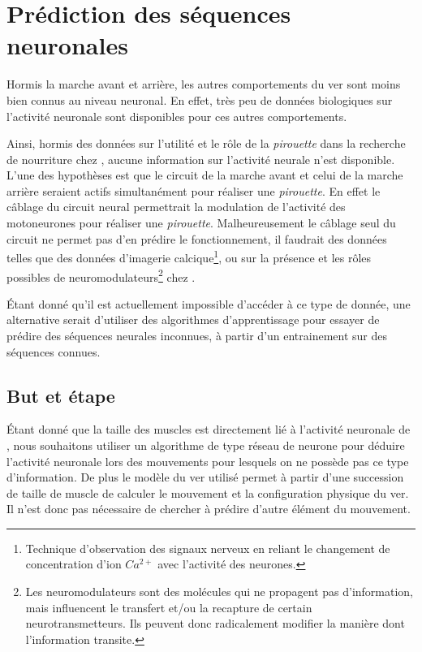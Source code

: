 \chapter{Prédiction des séquences neuronales} %
\label{cha:Prédire des séquences neuronales}

Hormis la marche avant et arrière, les autres comportements du ver sont moins
bien connus au niveau neuronal. En effet, très peu de données biologiques sur l'activité
neuronale sont disponibles pour ces autres comportements.

Ainsi, hormis des données sur l'utilité et le rôle de la \textit{pirouette}
dans la recherche de nourriture chez \celeg{}\cite{Gray2005}, aucune
information sur l'activité neurale n'est disponible. L'une des hypothèses
est que le circuit de la marche avant et celui de la marche arrière seraient
actifs simultanément pour réaliser une \textit{pirouette}. En effet le câblage
du circuit neural permettrait la modulation de l'activité des motoneurones pour
réaliser une \textit{pirouette}. Malheureusement le câblage seul du circuit ne
permet pas d'en prédire le fonctionnement, il faudrait des données telles que
des données d'imagerie calcique\footnote{Technique d'observation des signaux
nerveux en reliant le changement de concentration d'ion $Ca^{2+}$ avec
l'activité des neurones.}, ou sur la présence et les rôles possibles de
neuromodulateurs\footnote{Les neuromodulateurs sont des molécules qui ne
propagent pas d'information, mais influencent le transfert et/ou la recapture
de certain neurotransmetteurs. Ils peuvent donc radicalement modifier la
manière dont l'information transite.} chez \celeg{}.

Étant donné qu'il est actuellement impossible d'accéder à ce type de donnée, une
alternative serait d'utiliser des algorithmes d'apprentissage pour essayer de
prédire des séquences neurales inconnues, à partir d'un entrainement sur des
séquences connues.

\section{But et étape} %
\label{sec:But et étape}

Étant donné que la taille des muscles est directement lié à l'activité neuronale
de \celeg{}, nous souhaitons utiliser un algorithme de type réseau de neurone pour
déduire l'activité neuronale lors des mouvements pour lesquels on ne possède pas
ce type d'information. De plus le modèle du ver utilisé permet à partir d'une
succession de taille de muscle de calculer le mouvement et la configuration
physique du ver. Il n'est donc pas nécessaire de chercher à prédire d'autre
élément du mouvement.

